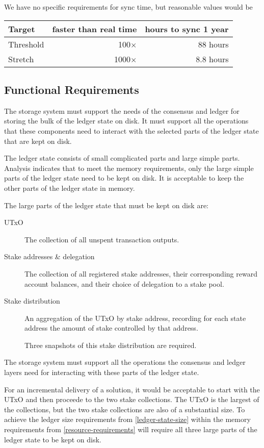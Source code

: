 \documentclass[11pt,a4paper]{article}
\begin{document}
We have no specific requirements for sync time, but reasonable values would be
\begin{center}
\begin{tabular}[]{lrr}
  Target    & faster than real time & hours to sync 1 year \\
  \toprule
  Threshold &  100$\times$ &  88 hours \\
  Stretch   & 1000$\times$ & 8.8 hours
\end{tabular}
\end{center}


\subsection{Functional Requirements}

The storage system must support the needs of the consensus and ledger for
storing the bulk of the ledger state on disk. It must support all the operations
that these components need to interact with the selected parts of the ledger
state that are kept on disk.

The ledger state consists of small complicated parts and large simple parts.
Analysis indicates that to meet the memory requirements, only the large simple
parts of the ledger state need to be kept on disk. It is acceptable to keep the
other parts of the ledger state in memory.

The large parts of the ledger state that must be kept on disk are:
\begin{description}
\item[UTxO]
    The collection of all unspent transaction outputs.
\item[Stake addresses \& delegation]
    The collection of all registered stake addresses, their corresponding
    reward account balances, and their choice of delegation to a stake pool.
\item[Stake distribution]
    An aggregation of the UTxO by stake address, recording for each state
    address the amount of stake controlled by that address.

    Three snapshots of this stake distribution are required.
\end{description}
The storage system must support all the operations the consensus and ledger
layers need for interacting with these parts of the ledger state.

For an incremental delivery of a solution, it would be acceptable to start with
the UTxO and then proceede to the two stake collections. The UTxO is the largest
of the collections, but the two stake collections are also of a substantial
size. To achieve the ledger size requirements from \cref{ledger-state-size}
within the memory requirements from \cref{resource-requirements} will require
all three large parts of the ledger state to be kept on disk.
\end{document}
